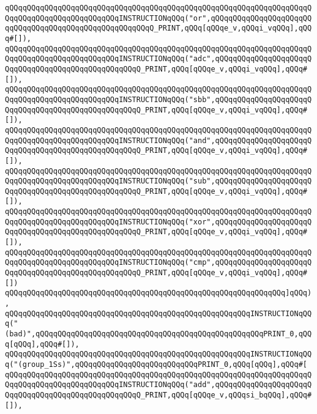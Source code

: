 \verb|qQQqqQQqqQQqqQQqqQQqqQQqqQQqqQQqqQQqqQQqqQQqqQQqqQQqqQQqqQQqqQQqqQQqqQQqqQQqqQQqqQQqqQQqqQQqqQQqINSTRUCTIONqQQq("or",qQQqqQQqqQQqqQQqqQQqqQQqqQQqqQQqqQQqqQQqqQQqqQQqqQQqqQQqQ_PRINT,qQQq[qQQqe_v,qQQqi_vqQQq],qQQq#[]),|\newline
\verb|qQQqqQQqqQQqqQQqqQQqqQQqqQQqqQQqqQQqqQQqqQQqqQQqqQQqqQQqqQQqqQQqqQQqqQQqqQQqqQQqqQQqqQQqqQQqqQQqINSTRUCTIONqQQq("adc",qQQqqQQqqQQqqQQqqQQqqQQqqQQqqQQqqQQqqQQqqQQqqQQqqQQqQ_PRINT,qQQq[qQQqe_v,qQQqi_vqQQq],qQQq#[]),|\newline
\verb|qQQqqQQqqQQqqQQqqQQqqQQqqQQqqQQqqQQqqQQqqQQqqQQqqQQqqQQqqQQqqQQqqQQqqQQqqQQqqQQqqQQqqQQqqQQqqQQqINSTRUCTIONqQQq("sbb",qQQqqQQqqQQqqQQqqQQqqQQqqQQqqQQqqQQqqQQqqQQqqQQqqQQqQ_PRINT,qQQq[qQQqe_v,qQQqi_vqQQq],qQQq#[]),|\newline
\verb|qQQqqQQqqQQqqQQqqQQqqQQqqQQqqQQqqQQqqQQqqQQqqQQqqQQqqQQqqQQqqQQqqQQqqQQqqQQqqQQqqQQqqQQqqQQqqQQqINSTRUCTIONqQQq("and",qQQqqQQqqQQqqQQqqQQqqQQqqQQqqQQqqQQqqQQqqQQqqQQqqQQqQ_PRINT,qQQq[qQQqe_v,qQQqi_vqQQq],qQQq#[]),|\newline
\verb|qQQqqQQqqQQqqQQqqQQqqQQqqQQqqQQqqQQqqQQqqQQqqQQqqQQqqQQqqQQqqQQqqQQqqQQqqQQqqQQqqQQqqQQqqQQqqQQqINSTRUCTIONqQQq("sub",qQQqqQQqqQQqqQQqqQQqqQQqqQQqqQQqqQQqqQQqqQQqqQQqqQQqQ_PRINT,qQQq[qQQqe_v,qQQqi_vqQQq],qQQq#[]),|\newline
\verb|qQQqqQQqqQQqqQQqqQQqqQQqqQQqqQQqqQQqqQQqqQQqqQQqqQQqqQQqqQQqqQQqqQQqqQQqqQQqqQQqqQQqqQQqqQQqqQQqINSTRUCTIONqQQq("xor",qQQqqQQqqQQqqQQqqQQqqQQqqQQqqQQqqQQqqQQqqQQqqQQqqQQqQ_PRINT,qQQq[qQQqe_v,qQQqi_vqQQq],qQQq#[]),|\newline
\verb|qQQqqQQqqQQqqQQqqQQqqQQqqQQqqQQqqQQqqQQqqQQqqQQqqQQqqQQqqQQqqQQqqQQqqQQqqQQqqQQqqQQqqQQqqQQqqQQqINSTRUCTIONqQQq("cmp",qQQqqQQqqQQqqQQqqQQqqQQqqQQqqQQqqQQqqQQqqQQqqQQqqQQqQ_PRINT,qQQq[qQQqe_v,qQQqi_vqQQq],qQQq#[])|\newline
\verb|qQQqqQQqqQQqqQQqqQQqqQQqqQQqqQQqqQQqqQQqqQQqqQQqqQQqqQQqqQQqqQQq]qQQq),|\newline
\verb|qQQqqQQqqQQqqQQqqQQqqQQqqQQqqQQqqQQqqQQqqQQqqQQqqQQqqQQqINSTRUCTIONqQQq("(bad)",qQQqqQQqqQQqqQQqqQQqqQQqqQQqqQQqqQQqqQQqqQQqqQQqqQQqPRINT_0,qQQq[qQQq],qQQq#[]),|\newline
\verb|qQQqqQQqqQQqqQQqqQQqqQQqqQQqqQQqqQQqqQQqqQQqqQQqqQQqqQQqINSTRUCTIONqQQq("(group_1Ss)",qQQqqQQqqQQqqQQqqQQqqQQqqQQqPRINT_0,qQQq[qQQq],qQQq#[|\newline
\verb|qQQqqQQqqQQqqQQqqQQqqQQqqQQqqQQqqQQqqQQqqQQqqQQqqQQqqQQqqQQqqQQqqQQqqQQqqQQqqQQqqQQqqQQqqQQqqQQqINSTRUCTIONqQQq("add",qQQqqQQqqQQqqQQqqQQqqQQqqQQqqQQqqQQqqQQqqQQqqQQqqQQqQ_PRINT,qQQq[qQQqe_v,qQQqsi_bqQQq],qQQq#[]),|\newline
